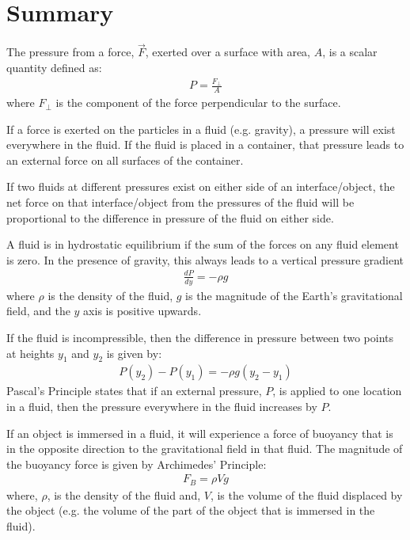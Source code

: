 {{\newpage
\section{Summary}

\begin{chapterSummary}
The pressure from a force, $\vec F$, exerted over a surface with area, $A$, is a scalar quantity defined as:
\begin{align*}
P = \frac{F_\perp}{A}
\end{align*}
where $F_\perp$ is the component of the force perpendicular to the surface.

If a force is exerted on the particles in a fluid (e.g. gravity), a pressure will exist everywhere in the fluid. If the fluid is placed in a container, that pressure leads to an external force on all surfaces of the container. 

If two fluids at different pressures exist on either side of an interface/object, the net force on that interface/object from the pressures of the fluid will be proportional to the difference in pressure of the fluid on either side.

A fluid is in hydrostatic equilibrium if the sum of the forces on any fluid element is zero. In the presence of gravity, this always leads to a vertical pressure gradient
\begin{align*}
\frac{dP}{dy}=-\rho g
\end{align*}
where $\rho$ is the density of the fluid, $g$ is the magnitude of the Earth's gravitational field, and the $y$ axis is positive upwards. 

If the fluid is incompressible, then the difference in pressure between two points at heights $y_1$ and $y_2$ is given by:
\begin{align*}
P(y_2)-P(y_1) =-\rho g (y_2-y_1)
\end{align*}
Pascal's Principle states that if an external pressure, $P$, is applied to one location in a fluid, then the pressure everywhere in the fluid increases by $P$.

If an object is immersed in a fluid, it will experience a force of buoyancy that is in the opposite direction to the gravitational field in that fluid. The magnitude of the buoyancy force is given by Archimedes' Principle:
\begin{align*}
F_B = \rho Vg
\end{align*}
where, $\rho$, is the density of the fluid and, $V$, is the volume of the fluid displaced by the object (e.g. the volume of the part of the object that is immersed in the fluid). 


\end{chapterSummary}}}
